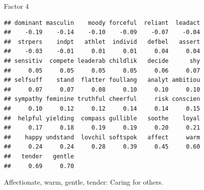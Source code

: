 \begin{frame}[fragile]{Factor 4}
  
  {\small
\begin{knitrout}
\color{fgcolor}\begin{kframe}
\begin{alltt}
\hlstd{mylist[[}\hlstd{]]}
\end{alltt}
\begin{verbatim}
## dominant masculin    moody forceful  reliant  leadact 
##    -0.19    -0.14    -0.10    -0.09    -0.07    -0.04 
##  strpers    indpt   athlet  individ   defbel   assert 
##    -0.03    -0.01     0.01     0.01     0.04     0.04 
## sensitiv  compete leaderab childlik   decide      shy 
##     0.05     0.05     0.05     0.05     0.06     0.07 
## selfsuff    stand  flatter foullang   analyt ambitiou 
##     0.07     0.07     0.08     0.10     0.10     0.10 
## sympathy feminine truthful cheerful     risk conscien 
##     0.10     0.12     0.12     0.14     0.14     0.15 
##  helpful yielding  compass gullible   soothe    loyal 
##     0.17     0.18     0.19     0.19     0.20     0.21 
##    happy undstand  lovchil softspok   affect     warm 
##     0.24     0.24     0.28     0.39     0.45     0.60 
##   tender   gentle 
##     0.69     0.70
\end{verbatim}
\end{kframe}
\end{knitrout}
}

Affectionate, warm, gentle, tender: Caring for others.

\end{frame}
